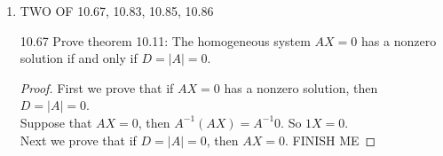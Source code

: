 \documentclass[12pt]{article}
\theoremstyle{definition}
\theoremstyle{plain}
\begin{document}
\begin{enumerate}
\begin{proof}
	\end{proof}
	
\item TWO OF 10.67, 10.83, 10.85, 10.86	
\item[10.67]Prove theorem 10.11: The homogeneous system $AX=0$ has a nonzero solution if and only if $D=|A|=0$.
	\begin{proof}
	First we prove that if $AX=0$ has a nonzero solution, then $D=|A|=0$.\\
	Suppose that $AX=0$, then $A^{-1}(AX)=A^{-1}0$. So $1X=0$.\\
	Next we prove that if $D=|A|=0$, then $AX=0$. FINISH ME
	\end{proof}
\end{enumerate}
\end{document}
